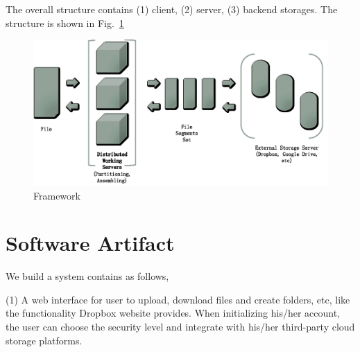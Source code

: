 
The overall structure contains (1) client, (2) server, (3) backend storages.
The structure is shown in Fig.~\ref{fig:frame} 

\begin{figure}[ht]
\centering
\includegraphics[width=6.5in]{pics/system_architecture-eps-converted-to.pdf}
\caption{Framework}
\label{fig:frame}
\end{figure}



\section{Software Artifact}
We build a system contains as follows, 


(1) A web interface for user to upload, download files and create folders, etc, like the functionality Dropbox website provides.
When initializing his/her account, the user can choose the security level and integrate with his/her third-party cloud storage platforms.


